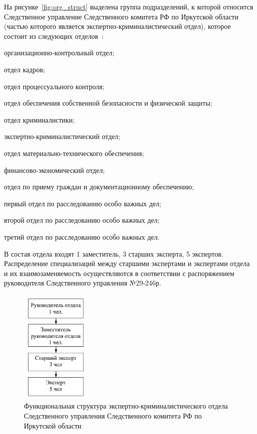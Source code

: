 На рисунке~\ref{fig:org_struct} выделена группа подразделений, к которой относится Следственное управление Следственного комитета РФ по Иркутской области (частью которого является экспертно-криминалистический отдел), которое состоит из следующих отделов~\cite{sled:struct}:

\begin{itemize*}
	\item организационно-контрольный отдел;
	\item отдел кадров;
	\item отдел процессуального контроля;
	\item отдел обеспечения собственной безопасности и физической защиты;
	\item отдел криминалистики;
	\item экспертно-криминалистический отдел;
	\item отдел материально-технического обеспечения;
	\item финансово-экономический отдел;
	\item отдел по приему граждан и документационному обеспечению;
	\item первый отдел по расследованию особо важных дел;
	\item второй отдел по расследованию особо важных дел;
	\item третий отдел по расследованию особо важных дел.
\end{itemize*}

В состав отдела входят 1 заместитель, 3 старших эксперта, 5 экспертов. Распределение специализаций между старшими экспертами и экспертами отдела и их взаимозаменяемость осуществляются в соответствии с распоряжением руководителя Следственного управления №29-246р.\cite{29-246}

\begin{figure}[H]
	\centering
	\includegraphics[width=0.3\textwidth]{pics/func_struct.png}
	\caption{Функциональная структура экспертно-криминалистического отдела Следственного управления Следственного комитета РФ по Иркутской области}
\end{figure}

